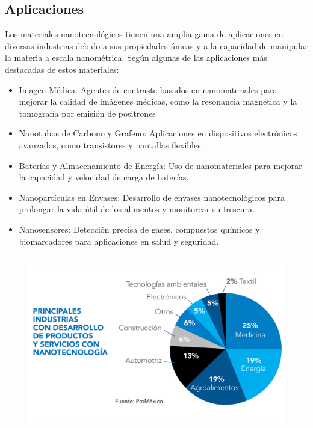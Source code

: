 \subsection{Aplicaciones}
Los materiales nanotecnológicos tienen una amplia gama de aplicaciones en diversas industrias debido a sus propiedades únicas y a la capacidad de manipular la materia a escala nanométrica. Según \cite{castagnino-mat-nanotecnologia} algunas de las aplicaciones más destacadas de estos materiales:
    \begin{itemize}
        \item Imagen Médica: Agentes de contraste basados en nanomateriales para mejorar la calidad de imágenes médicas, como la resonancia magnética y la tomografía por emisión de positrones
        \item Nanotubos de Carbono y Grafeno: Aplicaciones en dispositivos electrónicos avanzados, como transistores y pantallas flexibles.
        \item Baterías y Almacenamiento de Energía: Uso de nanomateriales para mejorar la capacidad y velocidad de carga de baterías.
        \item Nanopartículas en Envases: Desarrollo de envases nanotecnológicos para prolongar la vida útil de los alimentos y monitorear su frescura.
        \item Nanosensores: Detección precisa de gases, compuestos químicos y biomarcadores para aplicaciones en salud y seguridad.
    \end{itemize}

    \begin{figure}[h]
        \centering
        \includegraphics[height=7.8cm]{assets/figures/NANO.jpg}         
    \end{figure}
